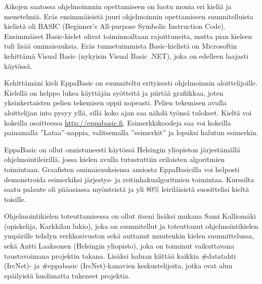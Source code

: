 
Aikojen saatossa ohjelmoinnnin opettamiseen
on luotu monia eri kieliä ja menetelmiä.
Eräs ensimmäisistä juuri ohjelmoinnin opettamiseen
suunnitelluista kielistä oli BASIC
(Beginner's All-purpose Symbolic Instruction Code).
Ensimmäiset Basic-kielet olivat toiminnoiltaan rajoittuneita,
mutta pian kieleen tuli lisää ominaisuuksia.
Eräs tunnetuimmista Basic-kielistä on
Microsoftin kehittämä Visual Basic
(nykyisin Visual Basic .NET),
joka on edelleen laajasti käytössä.

Kehittämäni kieli EppaBasic on suunniteltu
erityisesti ohjelmoinnin aloittelijoille.
Kielellä on helppo lukea käyttäjän syötteitä
ja piirtää grafiikkaa,
joten yksinkertaisten pelien tekemisen oppii nopeasti.
Pelien tekemisen avulla aloittelijan into pysyy yllä,
sillä koko ajan saa nähdä työnsä tulokset.
Kieltä voi kokeilla osoitteessa
\url{http://eppabasic.fi}.
Esimerkkikoodeja saa voi kokeilla painamalla
''Lataa''-nappia, valitsemalla ''esimerkit''
ja lopuksi halutun esimerkin.

EppaBasic on ollut onnistuneesti käytössä
Helsingin yliopiston järjestämällä ohjelmointileirillä,
jossa kielen avulla tutustuttiin erilaisten algoritmien toimintaan.
Graafisten ominaisuuksiensa ansiosta
EppaBasicilla voi helposti demonstroida
esimerkiksi järjestys- ja reitinhakualgoritmien toimintaa.
Kurssilta saatu palaute oli pääasiassa myönteistä
ja yli 80\% leiriläisistä suosittelisi kieltä toisille.


Ohjelmointikielen toteuttamisessa on ollut itseni lisäksi mukana
Sami Kalliomäki (opiskelija, Karkkilan lukio),
joka on suunnitellut ja toteuttanut ohjelmointikielen ympärille tehdyn verkkosivuston
sekä auttanut muutenkin kielen suunnittelussa,
sekä Antti Laaksonen (Helsingin yliopisto),
joka on toiminut vaikuttavana taustavoimana projektin takana.
Lisäksi haluan kiittää kaikkia \#datatahti (IrcNet)- ja \#eppabasic (IrcNet)-kanavien keskustelijoita,
jotka ovat alun epäilyistä huolimatta tukeneet projektia.


%
